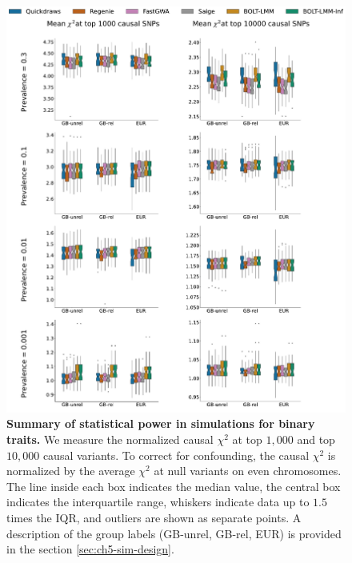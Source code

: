 \begin{figure}[h!]
    \centering
    \includegraphics[width=\textwidth]{figures/sim_power/bt_power.pdf}
    
    \caption{\textbf{
    Summary of statistical power in simulations for binary traits.}
    We measure the normalized causal $\chi^2$ at top $1{,}000$ and top $10{,}000$ causal variants.
    To correct for confounding, the causal $\chi^2$ is normalized by the average $\chi^2$ at null variants on even chromosomes.
    The line inside each box indicates the median value, the central box indicates the interquartile range, whiskers indicate data up to $1.5$ times the IQR, and outliers are shown as separate points.
    A description of the group labels (GB-unrel, GB-rel, EUR) is provided in the section \ref{sec:ch5-sim-design}.
    \label{fig:sim_power_bt}
    }
\end{figure}

